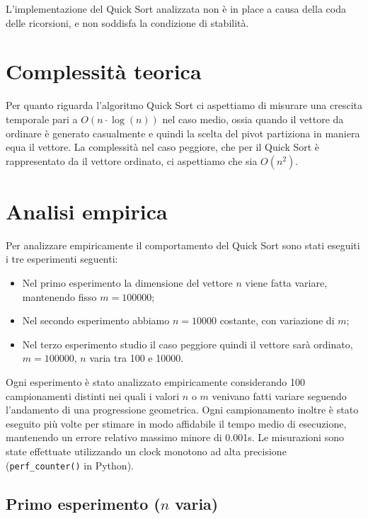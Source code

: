 \documentclass[a4paper, 12pt, oneside]{book}
\begin{document}
\noindent
L'implementazione del Quick Sort analizzata non è in place a causa della coda delle ricorsioni, e non soddisfa la condizione di stabilità.

\section{Complessità teorica}

Per quanto riguarda l'algoritmo Quick Sort ci aspettiamo di misurare una crescita temporale pari a $O(n\cdot \log(n))$ nel caso medio, ossia quando il vettore da ordinare è generato casualmente e quindi la scelta del pivot partiziona in maniera equa il vettore. La complessità nel caso peggiore, che per il Quick Sort è rappresentato da il vettore ordinato, ci aspettiamo che sia $O(n^2)$.


\section{Analisi empirica}

Per analizzare empiricamente il comportamento del Quick Sort sono stati eseguiti i tre esperimenti seguenti:

\begin{itemize}
    \item Nel primo esperimento la dimensione del vettore \(n\) viene fatta variare, mantenendo fisso \(m = 100000\);
    \item Nel secondo esperimento abbiamo \(n = 10000\) costante, con variazione di \(m\);
    \item Nel terzo esperimento studio il caso peggiore quindi il vettore sarà ordinato, \(m = 100000\), \(n\) varia tra 100 e 10000.
\end{itemize}

\noindent Ogni esperimento è stato analizzato empiricamente considerando 100 campionamenti distinti nei quali i valori $n$ o $m$ venivano fatti variare seguendo l'andamento di una progressione geometrica.
Ogni campionamento inoltre è stato eseguito più volte per stimare in modo affidabile il tempo medio di esecuzione, mantenendo un errore relativo massimo minore di 0.001s.
Le misurazioni sono state effettuate utilizzando un clock monotono ad alta precisione (\texttt{perf\_counter()} in Python). \\


\subsection{Primo esperimento ($n$ varia)}
\end{document}
